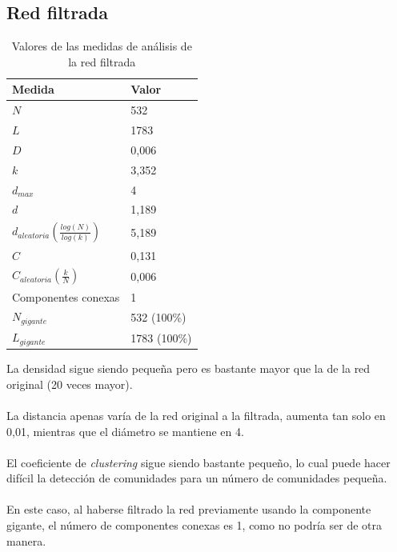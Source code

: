 \subsection{Red filtrada}

\begin{table}[H]
	\centering
	\caption{Valores de las medidas de análisis de la red filtrada}
	\label{tab:medidas-filtrada}
	\begin{tabular}{| l | l |}
		\hline
		Medida                						& Valor        \\ 
		\hline
		$N$                   						& 532          \\
		$L$                   						& 1783         \\
		$D$                 						& 0,006        \\
		$k$                  						& 3,352        \\
		$d_{max}$             						& 4            \\
		$d$                   						& 1,189        \\
		$d_{aleatoria} (\frac{log(N)}{log(k)})$		& 5,189        \\
		$C$                   						& 0,131        \\
		$C_{aleatoria} (\frac{k}{N})$       		& 0,006        \\ 
		Componentes conexas   						& 1            \\ 
		$N_{gigante}$         						& 532 (100\%)  \\ 
		$L_{gigante}$         						& 1783 (100\%) \\ 
		\hline
	\end{tabular}
\end{table}

La densidad sigue siendo pequeña pero es bastante mayor que la de la red original (20 veces mayor).
\\ \\
La distancia apenas varía de la red original a la filtrada, aumenta tan solo en 0,01, mientras que el diámetro se mantiene en 4.
\\ \\
El coeficiente de \textit{clustering} sigue siendo bastante pequeño, lo cual puede hacer difícil la detección de comunidades para un número de comunidades pequeña.
\\ \\
En este caso, al haberse filtrado la red previamente usando la componente gigante, el número de componentes conexas es 1, como no podría ser de otra manera.

